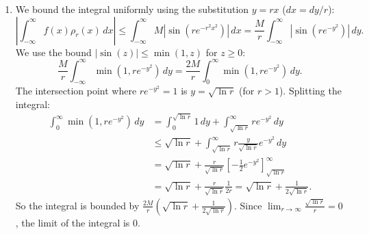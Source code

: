 \documentclass{article}
\begin{document}
\begin{enumerate}[label=\fbox{\arabic*}]
\begin{enumerate}[label=(\arabic*)]
          \item We bound the integral uniformly using the substitution $y = rx$ ($dx = dy/r$):
                \[
                  \left| \int_{-\infty}^\infty f(x) \rho_r(x) \, dx \right| \le \int_{-\infty}^\infty M |\sin(r e^{-r^2 x^2})| \, dx = \frac{M}{r} \int_{-\infty}^\infty |\sin(r e^{-y^2})| \, dy.
                \]
                We use the bound $|\sin(z)| \le \min(1, z)$ for $z \ge 0$:
                \[
                  \frac{M}{r} \int_{-\infty}^\infty \min(1, r e^{-y^2}) \, dy = \frac{2M}{r} \int_0^\infty \min(1, r e^{-y^2}) \, dy.
                \]
                The intersection point where $r e^{-y^2} = 1$ is $y = \sqrt{\ln r}$ (for $r > 1$). Splitting the integral:
                \begin{align*}
                  \int_0^\infty \min(1, r e^{-y^2}) \, dy &= \int_0^{\sqrt{\ln r}} 1 \, dy + \int_{\sqrt{\ln r}}^\infty r e^{-y^2} \, dy \\
                  &\le \sqrt{\ln r} + \int_{\sqrt{\ln r}}^\infty r \frac{y}{\sqrt{\ln r}} e^{-y^2} \, dy \\
                  &= \sqrt{\ln r} + \frac{r}{\sqrt{\ln r}} \left[ -\frac{1}{2} e^{-y^2} \right]_{\sqrt{\ln r}}^\infty \\
                  &= \sqrt{\ln r} + \frac{r}{\sqrt{\ln r}} \frac{1}{2r} = \sqrt{\ln r} + \frac{1}{2\sqrt{\ln r}}.
                \end{align*}
                So the integral is bounded by $\frac{2M}{r} \left( \sqrt{\ln r} + \frac{1}{2\sqrt{\ln r}} \right)$. Since $\lim_{r \to \infty} \frac{\sqrt{\ln r}}{r} = 0$, the limit of the integral is 0.


\end{enumerate}
\end{enumerate}
\end{document}
